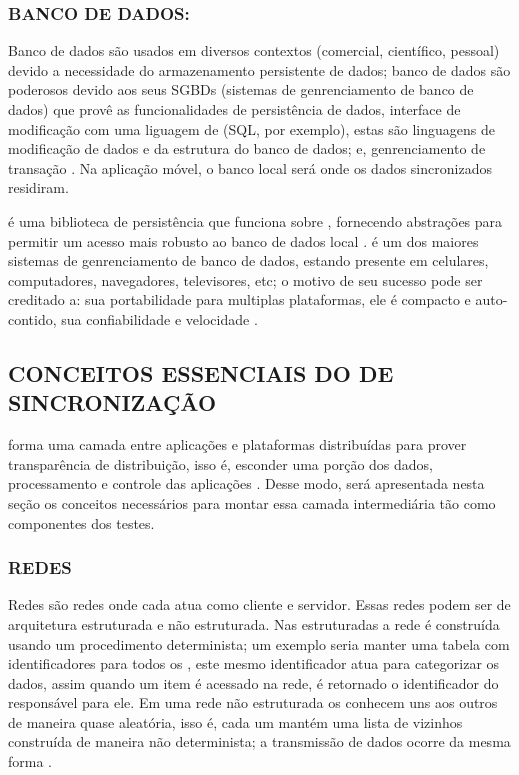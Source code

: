 \subsubsection{BANCO DE DADOS: }

Banco de dados são usados em diversos contextos (comercial, científico, pessoal) devido a necessidade do armazenamento persistente de dados; banco de dados são poderosos devido aos seus SGBDs (sistemas de genrenciamento de banco de dados) que provê as funcionalidades de persistência de dados, interface de modificação com uma liguagem de  (SQL, por exemplo), estas são linguagens de modificação de dados e da estrutura do banco de dados; e, genrenciamento de transação \cite{GarciaMolinaUllmanWidom2002DatabaseSystems}. Na aplicação móvel, o banco local será onde os dados sincronizados residiram.

 é uma biblioteca de persistência que funciona sobre , fornecendo abstrações para permitir um acesso mais robusto ao banco de dados local \cite{AndroidJetpackRoom}.  é um dos maiores sistemas de genrenciamento de banco de dados, estando presente em celulares, computadores, navegadores, televisores, etc; o motivo de seu sucesso pode ser creditado a: sua portabilidade para multiplas plataformas, ele é compacto e auto-contido, sua confiabilidade e velocidade \cite{GaffneyPrammerBrasfieldHippKennedyPatel2022}. 

\subsection{CONCEITOS ESSENCIAIS DO  DE \\ SINCRONIZAÇÃO}

 forma uma camada entre aplicações e plataformas distribuídas para prover transparência de distribuição, isso é, esconder uma porção dos dados, processamento e controle das aplicações \cite{tanenbaum2007dist}. Desse modo, será apresentada nesta seção os conceitos necessários para montar essa camada intermediária tão como componentes dos testes.

\subsubsection{REDES }

Redes  são redes onde cada  atua como cliente e servidor. Essas redes podem ser de arquitetura estruturada e não estruturada. Nas estruturadas a rede é construída usando um procedimento determinista; um exemplo seria manter uma tabela com identificadores para todos os , este mesmo identificador atua para categorizar os dados, assim quando um item é acessado na rede, é retornado o identificador do  responsável para ele. Em uma rede não estruturada os  conhecem uns aos outros de maneira quase aleatória, isso é, cada um mantém uma lista de vizinhos construída de maneira não determinista; a transmissão de dados ocorre da mesma forma \cite{tanenbaum2007dist}.

